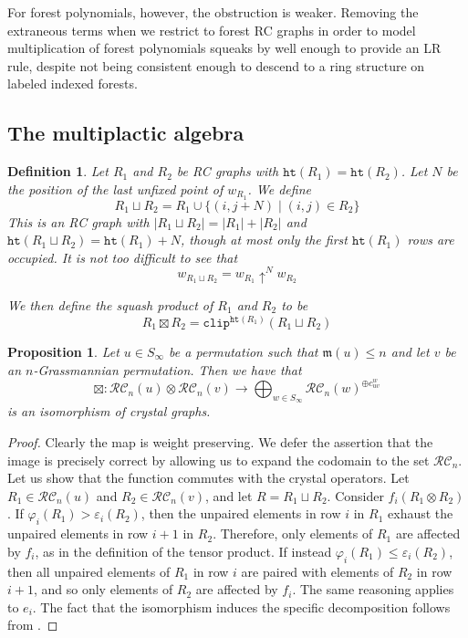 \documentclass[pdflatex,sn-mathphys-num]{sn-jnl}
\numberwithin{equation}{subsection}
\newcommand{\shup}{{\uparrow}}
\newcommand{\wof}[1]{w_{#1}}
\newcommand{\hr}{\mathtt{ht}}
\newcommand{\clp}{\mathtt{clip}}
\newcommand{\RC}{\mathcal{RC}}
\newcommand{\maxd}{\mathfrak{m}}
\theoremstyle{thmstyleone}
\newtheorem{proposition}[lemma]{Proposition}
\theoremstyle{thmstylethree}
\newtheorem{definition}[lemma]{Definition}
\theoremstyle{thmstyletwo}
\begin{document}
For forest polynomials, however, the obstruction is weaker. Removing the extraneous terms when we restrict to forest RC graphs in order to model multiplication of forest polynomials squeaks by well enough to provide an LR rule, despite not being consistent enough to descend to a ring structure on labeled indexed forests.


\subsection{The multiplactic algebra}\label{section:multiplactic}
\begin{definition}
Let $R_1$ and $R_2$ be RC graphs with $\hr(R_1)=\hr(R_2)$. Let $N$ be the position of the last unfixed point of $\wof{R_1}$. We define
$$R_1\sqcup R_2 = R_1\cup \{(i,j+N)\mid (i,j)\in R_2\}$$
This is an RC graph with $|R_1\sqcup R_2| = |R_1| + |R_2|$ and $\hr(R_1\sqcup R_2)=\hr(R_1) + N$, though at most only the first $\hr(R_1)$ rows are occupied.  It is not too difficult to see that
$$\wof{R_1\sqcup R_2} = \wof{R_1}\shup^{N}\wof{R_2}$$

We then define the \emph{squash product} of $R_1$ and $R_2$ to be
$$R_1\boxtimes R_2 = \clp^{\hr(R_1)}(R_1\sqcup R_2)$$

\end{definition}

\begin{proposition} \label{proposition:boxproduct}
  Let $u\in S_\infty$ be a permutation such that $\maxd(u)\leq n$ and let $v$ be an $n$-Grassmannian permutation. Then we have that
  $$\boxtimes:\RC_n(u)\otimes \RC_n(v)\to \bigoplus_{w\in S_\infty} \RC_n(w)^{\oplus c_{uv}^w}$$
  is an isomorphism of crystal graphs. 
\end{proposition}
\begin{proof}
Clearly the map is weight preserving. We defer the assertion that the image is precisely correct by allowing us to expand the codomain to the set $\RC_n$. 
Let us show that the function commutes with the crystal operators. Let $R_1\in \RC_n(u)$ and $R_2\in \RC_n(v)$, and let $R=R_1\sqcup R_2$. Consider $f_i(R_1\otimes R_2)$. If $\varphi_i(R_1)>\varepsilon_i(R_2)$, then the unpaired elements in row $i$ in $R_1$ exhaust the unpaired elements in row $i+1$ in $R_2$. Therefore, only elements of $R_1$ are affected by $f_i$, as in the definition of the tensor product. If instead $\varphi_i(R_1)\leq \varepsilon_i(R_2)$, then all unpaired elements of $R_1$ in row $i$ are paired with elements of $R_2$ in row $i+1$, and so only elements of $R_2$ are affected by $f_i$. The same reasoning applies to $e_i$. The fact that the isomorphism induces the specific decomposition follows from \cite{kouno2020decomposition}.
\end{proof}
\end{document}
